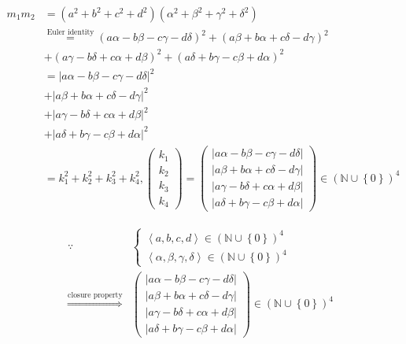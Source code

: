 \documentclass[
]{book}
\theoremstyle{definition}
\theoremstyle{definition}
\theoremstyle{definition}
\theoremstyle{definition}
\theoremstyle{remark}
\begin{document}
\[
\begin{aligned}
m_{{\scriptscriptstyle 1}}m_{2} & =\left(a^{2}+b^{2}+c^{2}+d^{2}\right)\left(\alpha^{2}+\beta^{2}+\gamma^{2}+\delta^{2}\right)\\
 & \overset{\text{Euler identity}}{=}\left(a\alpha-b\beta-c\gamma-d\delta\right)^{2}+\left(a\beta+b\alpha+c\delta-d\gamma\right)^{2}\\
 & +\left(a\gamma-b\delta+c\alpha+d\beta\right)^{2}+\left(a\delta+b\gamma-c\beta+d\alpha\right)^{2}\\
 & =\left|a\alpha-b\beta-c\gamma-d\delta\right|^{2}\\
 & +\left|a\beta+b\alpha+c\delta-d\gamma\right|^{2}\\
 & +\left|a\gamma-b\delta+c\alpha+d\beta\right|^{2}\\
 & +\left|a\delta+b\gamma-c\beta+d\alpha\right|^{2}\\
 & =k_{{\scriptscriptstyle 1}}^{2}+k_{2}^{2}+k_{{\scriptscriptstyle 3}}^{2}+k_{4}^{2},\begin{pmatrix}k_{{\scriptscriptstyle 1}}\\
k_{2}\\
k_{{\scriptscriptstyle 3}}\\
k_{4}
\end{pmatrix}=\begin{pmatrix}\left|a\alpha-b\beta-c\gamma-d\delta\right|\\
\left|a\beta+b\alpha+c\delta-d\gamma\right|\\
\left|a\gamma-b\delta+c\alpha+d\beta\right|\\
\left|a\delta+b\gamma-c\beta+d\alpha\right|
\end{pmatrix}\in\left(\mathbb{N}\cup\left\{ 0\right\} \right)^{4}
\end{aligned}
\]

\[
\begin{aligned}
\because & \begin{cases}
\left\langle a,b,c,d\right\rangle \in\left(\mathbb{N}\cup\left\{ 0\right\} \right)^{4}\\
\left\langle \alpha,\beta,\gamma,\delta\right\rangle \in\left(\mathbb{N}\cup\left\{ 0\right\} \right)^{4}
\end{cases}\\
\overset{\text{closure property}}{\Rightarrow} & \begin{pmatrix}\left|a\alpha-b\beta-c\gamma-d\delta\right|\\
\left|a\beta+b\alpha+c\delta-d\gamma\right|\\
\left|a\gamma-b\delta+c\alpha+d\beta\right|\\
\left|a\delta+b\gamma-c\beta+d\alpha\right|
\end{pmatrix}\in\left(\mathbb{N}\cup\left\{ 0\right\} \right)^{4}
\end{aligned}
\]
\[
\ \tag*{$\Box$}
\]
\end{document}
